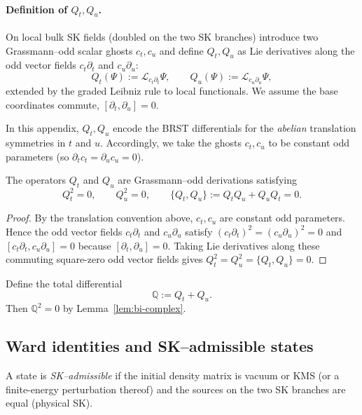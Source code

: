 \paragraph{Definition of $Q_t,Q_u$.}
On local bulk SK fields (doubled on the two SK branches) introduce two
Grassmann--odd scalar ghosts $c_t,c_u$ and define $Q_t,Q_u$ as Lie derivatives
along the odd vector fields $c_t\partial_t$ and $c_u\partial_u$:
\[
Q_t(\Psi) := \mathcal L_{c_t\partial_t}\Psi,\qquad
Q_u(\Psi) := \mathcal L_{c_u\partial_u}\Psi,
\]
extended by the graded Leibniz rule to local functionals.  We assume the base
coordinates commute, $[\partial_t,\partial_u]=0$.

\begin{remark}
In this appendix, $Q_t,Q_u$ encode the BRST differentials for the \emph{abelian}
translation symmetries in $t$ and $u$. Accordingly, we take the ghosts $c_t,c_u$
to be constant odd parameters (so $\partial_t c_t=\partial_u c_u=0$).
\end{remark}

\begin{lemma}
\label{lem:bi-complex}
The operators $Q_t$ and $Q_u$ are Grassmann--odd derivations satisfying
\[
Q_t^2 = 0,\qquad Q_u^2 = 0,\qquad \{Q_t,Q_u\}:=Q_tQ_u+Q_uQ_t=0.
\]
\end{lemma}

\begin{proof}
By the translation convention above, $c_t,c_u$ are constant odd parameters. Hence
the odd vector fields $c_t\partial_t$ and $c_u\partial_u$ satisfy
$(c_t\partial_t)^2=(c_u\partial_u)^2=0$ and
$[c_t\partial_t,c_u\partial_u]=0$ because $[\partial_t,\partial_u]=0$.
Taking Lie derivatives along these commuting square-zero odd vector fields gives
$Q_t^2=Q_u^2=\{Q_t,Q_u\}=0$.
\end{proof}

\begin{definition}
\label{def:total-diff}
Define the total differential
\[
\mathbb Q := Q_t+Q_u.
\]
Then $\mathbb Q^2=0$ by Lemma~\ref{lem:bi-complex}.
\end{definition}

\subsection{Ward identities and SK--admissible states}
\label{subsec:ward}

\begin{definition}
\label{def:SK-admissible}
A state is \emph{SK--admissible} if the initial density matrix is vacuum or KMS
(or a finite-energy perturbation thereof) and the sources on the two SK branches
are equal (physical SK).
\end{definition}

